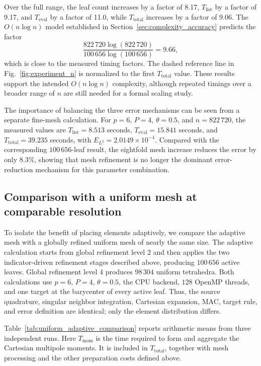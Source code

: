 \documentclass[a4paper,10pt]{article}
\begin{document}
Over the full range, the leaf count increases by a factor of 8.17,
\(T_{\mathrm{list}}\) by a factor of 9.17, and \(T_{\mathrm{eval}}\) by a
factor of 11.0, while \(T_{\mathrm{total}}\) increases by a factor of
9.06.  The \(O(n\log n)\) model established in
Section~\ref{sec:complexity_accuracy} predicts the
factor
\[
\frac{822\,720\log(822\,720)}
     {100\,656\log(100\,656)}
=9.66,
\]
which is close to the measured timing factors.  The dashed reference line
in Fig.~\ref{fig:experiment_n} is normalized to the first
\(T_{\mathrm{total}}\) value.  These results support the intended
\(O(n\log n)\) complexity, although repeated timings over a broader range
of \(n\) are still needed for a formal scaling study.

The importance of balancing the three error mechanisms can be seen from a
separate fine-mesh calculation.  For \(p=6\), \(P=4\),
\(\theta=0.5\), and \(n=822\,720\), the measured values are
\(T_{\mathrm{list}}=8.513\) seconds,
\(T_{\mathrm{eval}}=15.841\) seconds, and
\(T_{\mathrm{total}}=39.235\) seconds, with
\(E_{L^2}=2.0149\times10^{-4}\).  Compared with the corresponding
\(100\,656\)-leaf result, the eightfold mesh increase reduces the error by
only \(8.3\%\), showing that mesh refinement is no longer the dominant
error-reduction mechanism for this parameter combination.

\subsection{Comparison with a uniform mesh at comparable resolution}
\label{sec:uniform_adaptive_comparison}

To isolate the benefit of placing elements adaptively, we compare the
adaptive mesh with a globally refined uniform mesh of nearly the same size.
The adaptive calculation starts from global refinement level 2 and then
applies the two indicator-driven refinement stages described above, producing
\(100\,656\) active leaves.  Global refinement level 4 produces
\(98\,304\) uniform tetrahedra.  Both calculations use \(p=6\), \(P=4\),
\(\theta=0.5\), the CPU backend, \(128\) OpenMP threads, and one target at
the barycenter of every active leaf.  Thus, the source quadrature, singular
neighbor integration, Cartesian expansion, MAC, target rule, and error
definition are identical; only the element distribution differs.

Table~\ref{tab:uniform_adaptive_comparison} reports arithmetic means from
three independent runs.  Here \(T_{\mathrm{mom}}\) is the time required to
form and aggregate the Cartesian multipole moments.  It is included in
\(T_{\mathrm{total}}\), together with mesh processing and the other
preparation costs defined above.
\end{document}
